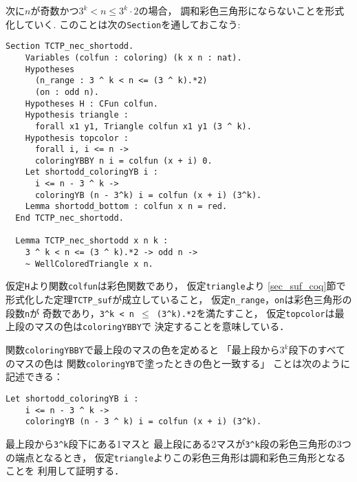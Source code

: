 次に$n$が奇数かつ$3^{k} < n \leq 3^{k} \cdot 2$の場合，
調和彩色三角形にならないことを形式化していく.
このことは次の{\tt{Section}}を通しておこなう:
\begin{lstlisting}[language=Coq]
  Section TCTP_nec_shortodd.
    Variables (colfun : coloring) (k x n : nat).
    Hypotheses
      (n_range : 3 ^ k < n <= (3 ^ k).*2)
      (on : odd n).
    Hypotheses H : CFun colfun.
    Hypothesis triangle :
      forall x1 y1, Triangle colfun x1 y1 (3 ^ k).
    Hypothesis topcolor :
      forall i, i <= n ->
      coloringYBBY n i = colfun (x + i) 0.
    Let shortodd_coloringYB i :
      i <= n - 3 ^ k ->
      coloringYB (n - 3^k) i = colfun (x + i) (3^k).
    Lemma shortodd_bottom : colfun x n = red.
  End TCTP_nec_shortodd.

  Lemma TCTP_nec_shortodd x n k :
    3 ^ k < n <= (3 ^ k).*2 -> odd n ->
    ~ WellColoredTriangle x n.
\end{lstlisting}
仮定{\tt{H}}より関数{\tt{colfun}}は彩色関数であり，
仮定{\tt{triangle}}より
\ref{sec_suf_coq}節で形式化した定理{\tt{TCTP\_suf}}が成立していること，
仮定{\tt{n\_range}}，{\tt{on}}は彩色三角形の段数{\tt{n}}が
奇数であり，{\tt{3\verb|^|k < n $\leq$ (3\verb|^|k).*2}}を満たすこと，
仮定{\tt{topcolor}}は最上段のマスの色は{\tt{coloringYBBY}}で
決定することを意味している．

関数{\tt{coloringYBBY}}で最上段のマスの色を定めると
「最上段から$3^k$段下のすべてのマスの色は
  関数{\tt{coloringYB}}で塗ったときの色と一致する」
ことは次のように記述できる：
\begin{lstlisting}[language=Coq]
  Let shortodd_coloringYB i :
    i <= n - 3 ^ k ->
    coloringYB (n - 3 ^ k) i = colfun (x + i) (3^k).
\end{lstlisting}
最上段から{\tt{3\verb|^|k}}段下にある1マスと
最上段にある2マスが{\tt{3\verb|^|k}}段の彩色三角形の3つの端点となるとき，
仮定{\tt{triangle}}よりこの彩色三角形は調和彩色三角形となることを
利用して証明する．

